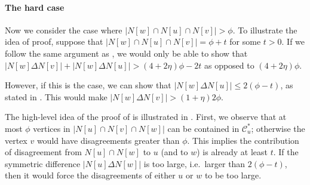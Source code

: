 \paragraph{The hard case} Now we consider the case where $|N[w] \cap N[u] \cap N[v]| > \phi$. To illustrate the idea of proof, suppose that $|N[w] \cap N[u] \cap N[v]| = \phi + t$ for some $t>0$. If we follow the same argument as , we would only be able to show that $|N[w] \Delta N[v]| + |N[w] \Delta N[u]| > (4+2\eta)\phi - 2t$ as opposed to $(4+2\eta)\phi$. 

However, if this is the case, we can show that $|N[w] \Delta N[u]| \leq 2(\phi-t)$, as stated in . This would make $|N[w] \Delta N[v]| > (1+\eta)2\phi$. 

The high-level idea of the proof of  is illustrated in . First, we observe that at most $\phi$ vertices in $|N[u] \cap N[v] \cap N[w]|$ can be contained in $\mathcal{C}^{*}_u$; otherwise the vertex $v$ would have disagreements greater than $\phi$. This implies the contribution of disagreement from $N[u] \cap N[w]$ to $u$ (and to $w$) is already at least $t$. If the symmetric difference $|N[u] \Delta N[w]|$ is too large, i.e.~larger than $2(\phi -t)$, then it would force the disagreements of either $u$ or $w$ to be too large.

